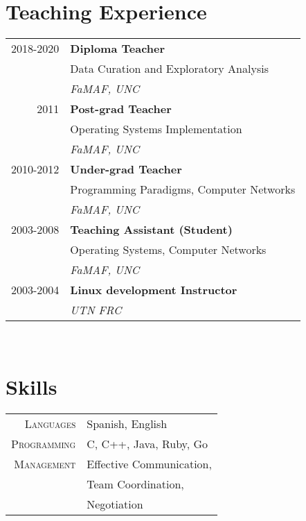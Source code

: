 \documentclass[10pt]{article}
\begin{document}
\begin{minipage}[t]{0.48\textwidth}

\section{Teaching Experience} 

\begin{tabular}{rl}
2018-2020 & \textbf{Diploma Teacher}\\
& \small Data Curation and Exploratory Analysis \\
& \textit{FaMAF, UNC}\\

2011	 & \textbf{Post-grad Teacher}\\
& \small Operating Systems Implementation \\
& \textit{FaMAF, UNC}\\

2010-2012	 & \textbf{Under-grad Teacher}\\
& \small Programming Paradigms, Computer Networks \\
& \textit{FaMAF, UNC}\\

2003-2008	 & \textbf{Teaching Assistant (Student)}\\
& \small Operating Systems, Computer Networks \\
& \textit{FaMAF, UNC}\\

2003-2004	 & \textbf{Linux development Instructor}\\
& \textit{UTN FRC}
\end{tabular}\\[10pt]



\section{Skills} 

\begin{tabular}{rl}
\textsc{Languages}
& Spanish, English\\
%
\textsc{Programming}
& C, C++, Java, Ruby, Go\\
%
\textsc{Management}
& Effective Communication, \\
& Team Coordination,\\
& Negotiation\\
\end{tabular}\\[10pt]



\end{minipage}
\end{document}

